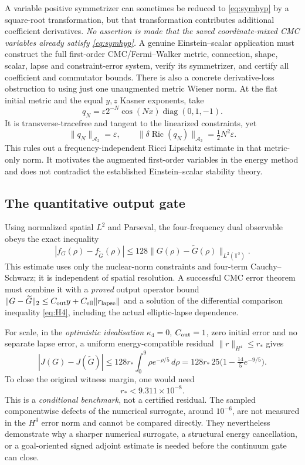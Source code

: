 \documentclass[11pt,a4paper]{article}
\theoremstyle{remark}
\begin{document}
A variable positive symmetrizer can sometimes be reduced to \eqref{eq:symhyp} by a square-root transformation, but that transformation contributes additional coefficient derivatives. \emph{No assertion is made that the saved coordinate-mixed CMC variables already satisfy \eqref{eq:symhyp}.} A genuine Einstein--scalar application must construct the full first-order CMC/Fermi--Walker metric, connection, shape, scalar, lapse and constraint-error system, verify its symmetrizer, and certify all coefficient and commutator bounds. There is also a concrete derivative-loss obstruction to using just one unaugmented metric Wiener norm. At the flat initial metric and the equal $y,z$ Kasner exponents, take
\[
q_N=\varepsilon2^{-N}\cos(Nx)\operatorname{diag}(0,1,-1).
\]
It is transverse-tracefree and tangent to the linearized constraints, yet
\[
\|q_N\|_{\mathcal A_2}=\varepsilon,
\qquad\|\delta\operatorname{Ric}(q_N)\|_{\mathcal A_2}
=\tfrac12N^2\varepsilon.
\]
This rules out a frequency-independent Ricci Lipschitz estimate in that metric-only norm. It motivates the augmented first-order variables in the energy method and does not contradict the established Einstein--scalar stability theory.

\subsection{The quantitative output gate}
Using normalized spatial $L^2$ and Parseval, the four-frequency dual observable obeys the exact inequality
\begin{equation}\label{eq:out-L2}
|f_G(\rho)-f_{\widetilde G}(\rho)|
\le128\|G(\rho)-\widetilde G(\rho)\|_{L^2(\mathbb T^3)}.
\end{equation}
This estimate uses only the nuclear-norm constraints and four-term Cauchy--Schwarz; it is independent of spatial resolution. A successful CMC error theorem must combine it with a \emph{proved} output operator bound $\|G-\widetilde G\|_2\le C_{\rm out}y+C_{\rm ell}\|r_{\rm lapse}\|$ and a solution of the differential comparison inequality \eqref{eq:H4}, including the actual elliptic-lapse dependence.

For scale, in the \emph{optimistic idealisation} $\kappa_4=0$, $C_{\rm out}=1$, zero initial error and no separate lapse error, a uniform energy-compatible residual $\|r\|_{H^4}\le r_*$ gives
\begin{equation}\label{eq:gate0}
|J(G)-J(\widetilde G)|
\le128r_*\int_0^9\rho e^{-\rho/5}\,d\rho
=128r_*\,25\big(1-\tfrac{14}{5}e^{-9/5}\big).
\end{equation}
To close the original witness margin, one would need
\begin{equation}\label{eq:optimistic}
r_*<9.311\times10^{-8}.
\end{equation}
This is a \emph{conditional benchmark}, not a certified residual. The sampled componentwise defects of the numerical surrogate, around $10^{-6}$, are not measured in the $H^4$ error norm and cannot be compared directly. They nevertheless demonstrate why a sharper numerical surrogate, a structural energy cancellation, or a goal-oriented signed adjoint estimate is needed before the continuum gate can close.
\end{document}
